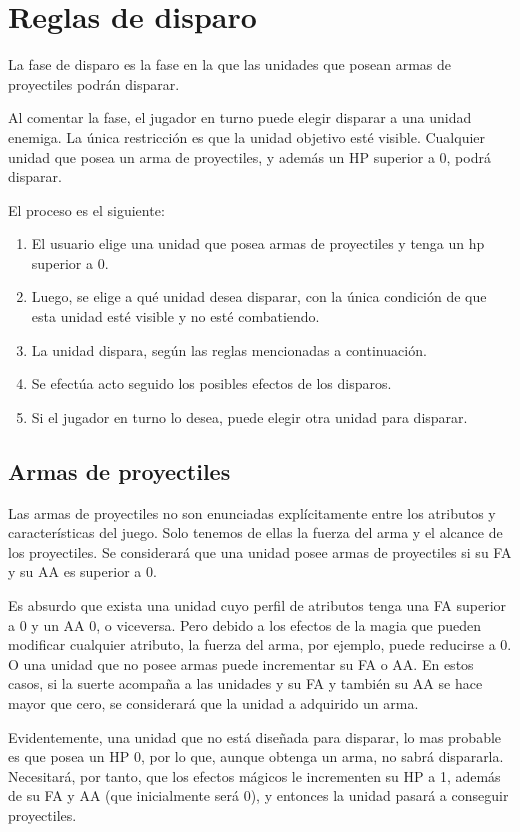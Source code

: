 \section*{Reglas de disparo}
\label{disparo}
La fase de disparo es la fase en la que las unidades que posean armas
de proyectiles podrán disparar.

Al comentar la fase, el jugador en turno puede elegir disparar a una
unidad enemiga. La única restricción es que la unidad objetivo esté
visible. Cualquier unidad que posea un arma de proyectiles, y además un HP superior a 0,
podrá disparar.

El proceso es el siguiente:
\begin{enumerate}
\item El usuario elige una unidad que posea armas de proyectiles y
  tenga un hp superior a 0.
\item Luego, se elige a qué unidad desea disparar, con la única
  condición de que esta unidad esté visible  y no
  esté combatiendo.
\item La unidad dispara, según las reglas mencionadas a continuación.
\item Se efectúa acto seguido los posibles efectos de los disparos.
\item Si el jugador en turno lo desea, puede elegir otra unidad para disparar.
\end{enumerate}

\subsection*{Armas de proyectiles}
\label{armas}
Las armas de proyectiles no son enunciadas explícitamente entre los
atributos y características del juego. Solo tenemos de ellas la fuerza
del arma y el alcance de los proyectiles. Se considerará que una
unidad posee armas de proyectiles si su FA y su AA es superior a 0.

Es absurdo que exista una unidad cuyo perfil de atributos tenga una FA
superior a 0 y un AA 0, o viceversa. Pero debido a los efectos de la
magia que pueden modificar cualquier atributo, la fuerza del arma,
por ejemplo, puede reducirse a 0. O una unidad que no posee armas
puede incrementar su FA o AA. En estos casos, si la suerte acompaña a
las unidades y su FA y también su AA se hace mayor que cero, se
considerará que la unidad a adquirido un arma.

Evidentemente, una unidad que no está diseñada para disparar, lo mas
probable es que posea un HP 0, por lo que, aunque obtenga un arma, no
sabrá dispararla. Necesitará, por tanto, que los efectos mágicos le
incrementen su HP a 1, además de su FA y AA (que inicialmente será 0),
y entonces la unidad pasará a conseguir proyectiles.

